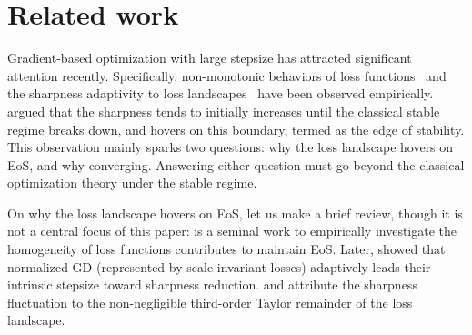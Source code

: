 \section{Related work}
\label{section:related}
Gradient-based optimization with large stepsize has attracted significant attention recently.
Specifically, non-monotonic behaviors of loss functions~\citep{Xing2018} and the sharpness adaptivity to loss landscapes~\citep{Lewkowycz2020,Cohen2021ICLR} have been observed empirically.
\citet{Cohen2021ICLR} argued that the sharpness tends to initially increases until the classical stable regime breaks down, and hovers on this boundary, termed as the edge of stability.
This observation mainly sparks two questions: why the loss landscape hovers on EoS, and why converging.
Answering either question must go beyond the classical optimization theory under the stable regime.

On why the loss landscape hovers on EoS, let us make a brief review, though it is not a central focus of this paper: \citet{Ahn2022ICML} is a seminal work to empirically investigate the homogeneity of loss functions contributes to maintain EoS.
Later, \citet{Lyu2022NeurIPS} showed that normalized GD (represented by scale-invariant losses) adaptively leads their intrinsic stepsize toward sharpness reduction.
\citet{Ma2022} and \citet{Damian2023ICLR} attribute the sharpness fluctuation to the non-negligible third-order Taylor remainder of the loss landscape.

